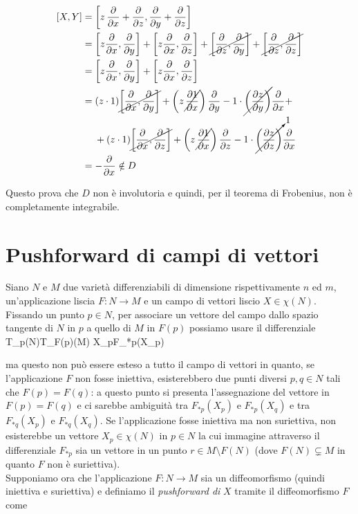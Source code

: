 \begin{align}
	\begin{split}
		[X,Y] &= \left[ z \, \pdv{x} + \pdv{z} , \pdv{y} + \pdv{z} \right] \\
		&= \left[ z \pdv{x}, \pdv{y} \right] + \left[ z \pdv{x}, \pdv{z} \right] + \cancel{\left[ \pdv{z}, \pdv{y} \right]} + \cancel{\left[ \pdv{z}, \pdv{z} \right]} \\
		&= \left[ z \pdv{x}, \pdv{y} \right] + \left[ z \pdv{x}, \pdv{z} \right] \\
		&= (z \cdot 1) \cancel{\left[ \pdv{x}, \pdv{y} \right]} + \left( z \, \cancel{ \pdv{1}{x} } \right) \pdv{y} - 1 \cdot \cancel{\left( \pdv{z}{y} \right)} \pdv{x} + \\
		& \hal + (z \cdot 1) \cancel{\left[ \pdv{x}, \pdv{z} \right]} + \left( z \, \cancel{\pdv{1}{x}} \right) \pdv{z} - 1 \cdot \cancelto{1}{\left( \pdv{z}{z} \right)} \pdv{x} \\
		&= - \pdv{x} \notin D
	\end{split}
\end{align}

Questo prova che $ D $ non è involutoria e quindi, per il teorema di Frobenius, non è completamente integrabile.

\section{Pushforward di campi di vettori}

Siano $ N $ e $ M $ due varietà differenziabili di dimensione rispettivamente $ n $ ed $ m $, un'applicazione liscia $ F : N \to M $ e un campo di vettori liscio $ X \in \chi(N) $. Fissando un punto $ p \in N $, per associare un vettore del campo dallo spazio tangente di $ N $ in $ p $ a quello di $ M $ in $ F(p) $ possiamo usare il differenziale
%
	{T_{p}(N)}{T_{F(p)}(M)}
	{X_{p}}{F_{*p}(X_{p})}

ma questo non può essere esteso a tutto il campo di vettori in quanto, se l'applicazione $ F $ non fosse iniettiva, esisterebbero due punti diversi $ p,q \in N $ tali che $ F(p) = F(q) $: a questo punto si presenta l'assegnazione del vettore in $ F(p) = F(q) $ e ci sarebbe ambiguità tra $ F_{*p}(X_{p}) $ e $ F_{*p}(X_{q}) $ e tra $ F_{*q}(X_{p}) $ e $ F_{*q}(X_{q}) $. Se l'applicazione fosse iniettiva ma non suriettiva, non esisterebbe un vettore $ X_{p} \in \chi(N) $ in $ p \in N $ la cui immagine attraverso il differenziale $ F_{*p} $ sia un vettore in un punto $ r \in M \setminus F(N) $ (dove $ F(N) \subsetneq M $ in quanto $ F $ non è suriettiva). \\
Supponiamo ora che l'applicazione $ F : N \to M $ sia un diffeomorfismo (quindi iniettiva e suriettiva) e definiamo il \textit{pushforward di} $ X $ tramite il diffeomorfismo $ F $ come

